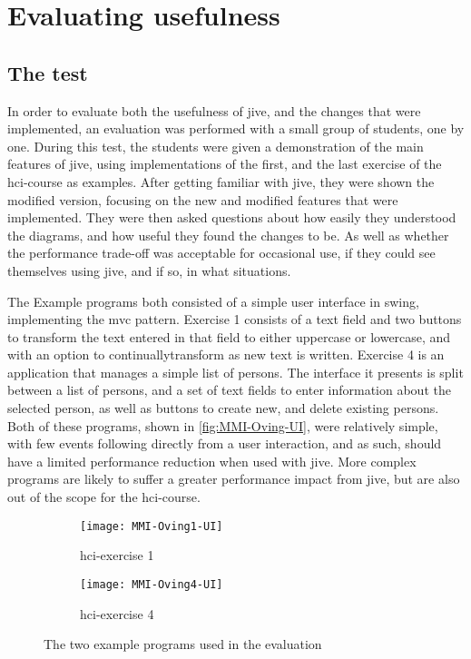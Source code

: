 \chapter{Evaluating usefulness}\label{jiveEval}
\section{The test}\label{jiveEvalTest}%
In order to evaluate both the usefulness of \gls{jive}, and the changes that were implemented, an evaluation was performed with a small group of students, one by one.
During this test, the students were given a demonstration of the main features of \gls{jive}, using implementations of the first, and the last exercise of the \gls{hci}-course as examples.
After getting familiar with \gls{jive}, they were shown the modified version, focusing on the new and modified features that were implemented.
They were then asked questions about how easily they understood the diagrams, and how useful they found the changes to be.
As well as whether the performance trade-off was acceptable for occasional use, if they could see themselves using \gls{jive}, and if so, in what situations.

The Example programs both consisted of a simple user interface in swing, implementing the \gls{mvc} pattern.
Exercise 1 consists of a text field and two buttons to transform the text entered in that field to either uppercase or lowercase, and with an option to continuallytransform as new text is written.
Exercise 4 is an application that manages a simple list of persons.
The interface it presents is split between a list of persons, and a set of text fields to enter information about the selected person, as well as buttons to create new, and delete existing persons.
Both of these programs, shown in \autoref{fig:MMI-Oving-UI}, were relatively simple, with few events following directly from a user interaction, and as such, should have a limited performance reduction when used with \gls{jive}.
More complex programs are likely to suffer a greater performance impact from \gls{jive}, but are also out of the scope for the \gls{hci}-course.


\begin{figure}[H]
	\centering
	\begin{subfigure}{\textwidth}
		\centering
		\texttt{[image: MMI-Oving1-UI]}
		\caption{\gls{hci}-exercise 1}
		\label{fig:MMI-Oving1-UI}
	\end{subfigure}
	\begin{subfigure}{\textwidth}
		\centering
		\texttt{[image: MMI-Oving4-UI]}
		\caption{\gls{hci}-exercise 4}
		\label{fig:MMI-Oving4-UI}
	\end{subfigure}
	\caption{The two example programs used in the evaluation}
	\label{fig:MMI-Oving-UI}
\end{figure}

